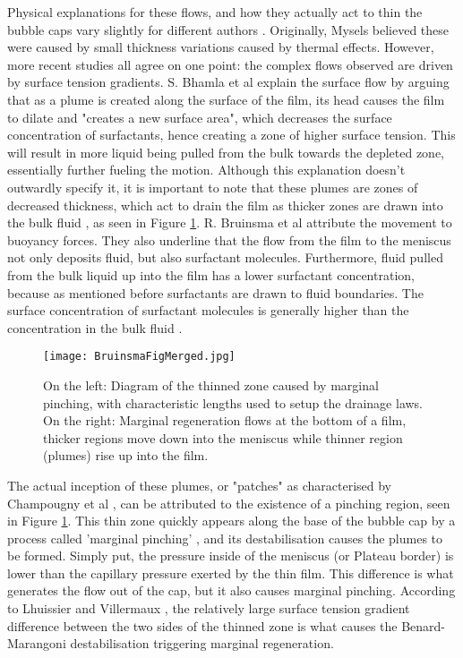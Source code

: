 \documentclass[a4paper,12pt]{article}
\numberwithin{equation}{section}
\numberwithin{figure}{section}
\numberwithin{table}{section}
\begin{document}
Physical explanations for these flows, and how they actually act to thin the bubble caps vary slightly for different authors \cite{Nierstrasz1999, Bhamla2017, Lhuissier2011, ChampougnyNotBare2016, Bruinsma1995}. Originally, Mysels \cite{Mysels1959Book} believed these were caused by small thickness variations caused by thermal effects. However, more recent studies all agree on one point: the complex flows observed are driven by surface tension gradients. S. Bhamla et al \cite{Bhamla2017} explain the surface flow by arguing that as a plume is created along the surface of the film, its head causes the film to dilate and "creates a new surface area", which decreases the surface concentration of surfactants, hence creating a zone of higher surface tension. This will result in more liquid being pulled from the bulk towards the depleted zone, essentially further fueling the motion. Although this explanation doesn't outwardly specify it, it is important to note that these plumes are zones of decreased thickness, which act to drain the film as thicker zones are drawn into the bulk fluid \cite{Lhuissier2011, Nierstrasz1999}, as seen in Figure \ref{fig:BruinsmaMerge}. R. Bruinsma et al \cite{Bruinsma1995} attribute the movement to buoyancy forces. They also underline that the flow from the film to the meniscus not only deposits fluid, but also surfactant molecules. Furthermore, fluid pulled from the bulk liquid up into the film has a lower surfactant concentration, because as mentioned before surfactants are drawn to fluid boundaries. The surface concentration of surfactant molecules is generally higher than the concentration in the bulk fluid \cite{Gast1997}.

\begin{figure}[!htbp]
    \centering
    \captionsetup{width=.9\linewidth}
    \texttt{[image: BruinsmaFigMerged.jpg]}
    \caption{On the left: Diagram of the thinned zone caused by marginal pinching, with characteristic lengths used to setup the drainage laws. On the right: Marginal regeneration flows at the bottom of a film, thicker regions move down into the meniscus while thinner region (plumes) rise up into the film. \cite{Bruinsma1995}}
    \label{fig:BruinsmaMerge}
\end{figure}

The actual inception of these plumes, or "patches" as characterised by Champougny et al \cite{ChampougnyEvap2018}, can be attributed to the existence of a pinching region, seen in Figure \ref{fig:BruinsmaMerge}. This thin zone quickly appears along the base of the bubble cap by a process called 'marginal pinching' \cite{Joye1994, Aradian2001}, and its destabilisation causes the plumes to be formed. Simply put, the pressure inside of the meniscus (or Plateau border) is lower than the capillary pressure exerted by the thin film. This difference is what generates the flow out of the cap, but it also causes marginal pinching. According to Lhuissier and Villermaux \cite{Lhuissier2011}, the relatively large surface tension gradient difference between the two sides of the thinned zone is what causes the Benard-Marangoni destabilisation triggering marginal regeneration.
\end{document}

